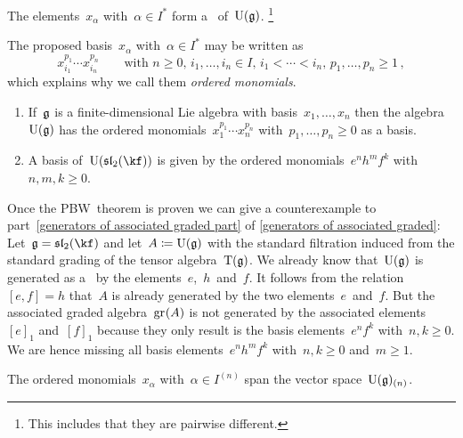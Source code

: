 \begin{theorem}
  \label{pbw concrete}
  The elements~$x_\alpha$ with~$\alpha \in I^*$ form a~{\basis{$\kf$}} of~$\operatorname{U}(\mathfrak{g})$.%
  \footnote{This includes that they are pairwise different.}
\end{theorem}


\begin{remark}
  The proposed basis~$x_\alpha$ with~$\alpha \in I^*$ may be written as
  \[
    x_{i_1}^{p_1} \dotsm x_{i_n}^{p_n}
    \qquad
    \text{with~$n \geq 0$,~$i_1, \dotsc, i_n \in I$,~$i_1 < \dotsb < i_n$,~$p_1, \dotsc, p_n \geq 1$} \,,
  \]
  which explains why we call them \emph{ordered monomials}.
\end{remark}


\begin{example}
  \leavevmode
  \begin{enumerate}
    \item
      If~$\mathfrak{g}$ is a finite-dimensional Lie algebra with basis~$x_1, \dotsc, x_n$ then the algebra~$\operatorname{U}(\mathfrak{g})$ has the ordered monomials~$x_1^{p_1} \dotsm x_n^{p_n}$ with~$p_1, \dotsc, p_n \geq 0$ as a basis.
    \item
      A basis of~$\Univ(\sllie_2(\kf))$ is given by the ordered monomials~$e^n h^m f^k$ with~$n, m, k \geq 0$.
  \end{enumerate}
\end{example}


\begin{example}
  Once the PBW~theorem is proven we can give a counterexample to part~\ref*{generators of associated graded part} of \cref{generators of associated graded}:
  Let~$\glie = \sllie_2(\kf)$ and let~$A \coloneqq \operatorname{U}(\mathfrak{g})$ with the standard filtration induced from the standard grading of the tensor algebra~$\operatorname{T}(\mathfrak{g})$.
  We already know that~$\operatorname{U}(\mathfrak{g})$ is generated as a~{\algebra{$\kf$}} by the elements~$e$,~$h$~and~$f$.
  It follows from the relation~$[e,f] = h$ that~$A$ is already generated by the two elements~$e$~and~$f$.
  But the associated graded algebra~$\gr(A)$ is not generated by the associated elements~$[e]_1$ and~$[f]_1$ because they only result is the basis elements~$e^n f^k$ with~$n, k \geq 0$.
  We are hence missing all basis elements~$e^n h^m f^k$ with~$n, k \geq 0$ and~$m \geq 1$.
\end{example}


\begin{lemma}
  \label{pbw concrete generating part filtered part}
  The ordered monomials~$x_\alpha$ with~$\alpha \in I^{(n)}$ span the vector space~$\operatorname{U}(\mathfrak{g})_{(n)}$.
\end{lemma}


